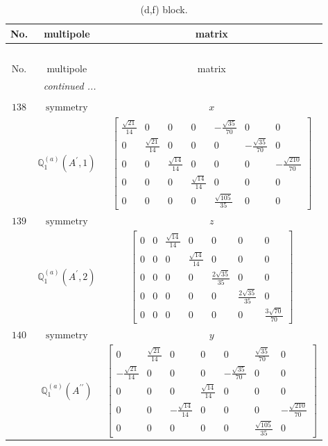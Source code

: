 \documentclass[fleqn,8pt,landscape]{jsarticle}
\begin{document}
\begin{longtable}{ccc}
\caption{(d,f) block.}
 \\
 \hline \hline
No. & multipole & matrix \\ \hline \endfirsthead

\multicolumn{2}{l}{\tablename\ \thetable{}} \\
 \hline \hline
No. & multipole & matrix \\ \hline \endhead

 \hline \hline
\multicolumn{2}{r}{\footnotesize\it continued ...} \\ \endfoot

 \hline \hline
\multicolumn{2}{r}{} \\ \endlastfoot

$ 138 $ & $ \text{symmetry} $ & $ x $ \\
$  $ & $ \mathbb{Q}_{1}^{(a)}(A^{\prime},1) $ & $ \begin{bmatrix} \frac{\sqrt{21}}{14} & 0 & 0 & 0 & - \frac{\sqrt{35}}{70} & 0 & 0 \\ 0 & \frac{\sqrt{21}}{14} & 0 & 0 & 0 & - \frac{\sqrt{35}}{70} & 0 \\ 0 & 0 & \frac{\sqrt{14}}{14} & 0 & 0 & 0 & - \frac{\sqrt{210}}{70} \\ 0 & 0 & 0 & \frac{\sqrt{14}}{14} & 0 & 0 & 0 \\ 0 & 0 & 0 & 0 & \frac{\sqrt{105}}{35} & 0 & 0 \end{bmatrix} $ \\ \hline
$ 139 $ & $ \text{symmetry} $ & $ z $ \\
$  $ & $ \mathbb{Q}_{1}^{(a)}(A^{\prime},2) $ & $ \begin{bmatrix} 0 & 0 & \frac{\sqrt{14}}{14} & 0 & 0 & 0 & 0 \\ 0 & 0 & 0 & \frac{\sqrt{14}}{14} & 0 & 0 & 0 \\ 0 & 0 & 0 & 0 & \frac{2 \sqrt{35}}{35} & 0 & 0 \\ 0 & 0 & 0 & 0 & 0 & \frac{2 \sqrt{35}}{35} & 0 \\ 0 & 0 & 0 & 0 & 0 & 0 & \frac{3 \sqrt{70}}{70} \end{bmatrix} $ \\ \hline
$ 140 $ & $ \text{symmetry} $ & $ y $ \\
$  $ & $ \mathbb{Q}_{1}^{(a)}(A^{\prime\prime}) $ & $ \begin{bmatrix} 0 & \frac{\sqrt{21}}{14} & 0 & 0 & 0 & \frac{\sqrt{35}}{70} & 0 \\ - \frac{\sqrt{21}}{14} & 0 & 0 & 0 & - \frac{\sqrt{35}}{70} & 0 & 0 \\ 0 & 0 & 0 & \frac{\sqrt{14}}{14} & 0 & 0 & 0 \\ 0 & 0 & - \frac{\sqrt{14}}{14} & 0 & 0 & 0 & - \frac{\sqrt{210}}{70} \\ 0 & 0 & 0 & 0 & 0 & \frac{\sqrt{105}}{35} & 0 \end{bmatrix} $ \\ \hline

\end{longtable}
\end{document}
